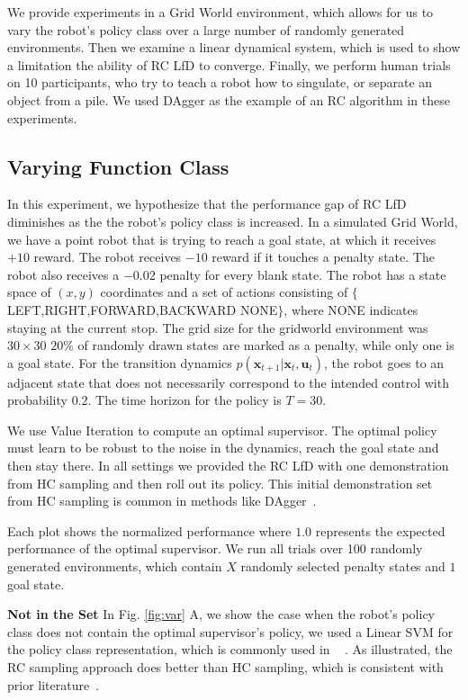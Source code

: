 \documentclass[10pt, conference]{ieeeconf}      %
\newcommand{\bu}{\mathbf{u}}
\newcommand{\bx}{\mathbf{x}}
\begin{document}
We provide experiments in a  Grid World environment, which allows for us to vary the robot's policy class over a large number of randomly generated environments. Then we examine a linear dynamical system, which is used to show a limitation the ability of RC LfD to converge. Finally, we perform human trials on 10 participants, who try to teach a robot how to singulate, or separate an object from a pile. We used DAgger as the example of an RC algorithm in these experiments. 

\subsection{Varying Function Class}\label{sec:gdw}
In this experiment, we hypothesize that the performance gap of RC LfD diminishes as the the robot's policy class is increased. In a simulated Grid World, we have a point robot that is trying to reach a goal state, at which it receives $+10$ reward. The robot receives $-10$ reward if it touches a penalty state. The robot also receives a $-0.02$ penalty for every blank state. The robot has a state space of $(x,y)$ coordinates and a set of actions consisting of $\lbrace$LEFT,RIGHT,FORWARD,BACKWARD NONE$\rbrace$, where NONE indicates staying at the current stop. The grid size for the gridworld environment was $30 \times 30$ $20\%$ of randomly drawn states are marked as a penalty, while only one is a goal state. For the transition dynamics $p(\bx_{t+1}|\bx_{t},\bu_t)$, the robot goes to an adjacent state that does not necessarily correspond to the intended control with probability $0.2$.  The time horizon for the policy is $T=30$. 

We use Value Iteration to compute an optimal supervisor. The optimal policy must learn to be robust to the noise in the dynamics, reach the goal state and then stay there. In all settings we provided the RC LfD with one demonstration from HC sampling and then roll out its policy. This initial demonstration set from HC sampling is common in methods like DAgger~\cite{rossreduction2010}.

Each plot shows the normalized performance where $1.0$ represents the expected performance of the optimal supervisor. We run all trials over 100 randomly generated environments, which contain $X$ randomly selected penalty states and $1$ goal state. 


\noindent \textbf{Not in the Set} In Fig. \ref{fig:var} A, we show the case when the robot's policy class does not contain the optimal supervisor's policy, we used a Linear SVM for the policy class representation, which is commonly used in ~\cite{ross2010efficient,ross2010reduction,ross2013learning} . As illustrated, the RC sampling approach does better than HC sampling, which is consistent with prior literature~\cite{ross2010efficient,ross2010reduction}.
\end{document}
